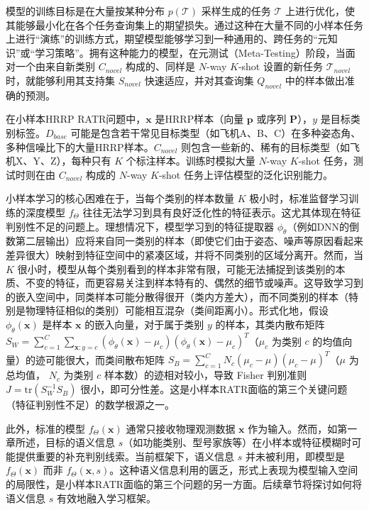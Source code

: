 模型的训练目标是在大量按某种分布 $p(\mathcal{T})$ 采样生成的任务 $\mathcal{T}$ 上进行优化，使其能够最小化在各个任务查询集上的期望损失。通过这种在大量不同的小样本任务上进行“演练”的训练方式，期望模型能够学习到一种通用的、跨任务的“元知识”或“学习策略”。拥有这种能力的模型，在元测试（Meta-Testing）阶段，当面对一个由来自新类别 $C_{novel}$ 构成的、同样是 $N$-way $K$-shot 设置的新任务 $\mathcal{T}_{novel}$ 时，就能够利用其支持集 $S_{novel}$ 快速适应，并对其查询集 $Q_{novel}$ 中的样本做出准确的预测。

在小样本HRRP RATR问题中，$\mathbf{x}$ 是HRRP样本（向量 $\mathbf{p}$ 或序列 $\mathbf{P}$），$y$ 是目标类别标签。$D_{base}$ 可能是包含若干常见目标类型（如飞机A、B、C）在多种姿态角、多种信噪比下的大量HRRP样本。$C_{novel}$ 则包含一些新的、稀有的目标类型（如飞机X、Y、Z），每种只有 $K$ 个标注样本。训练时模拟大量 $N$-way $K$-shot 任务，测试时则在由 $C_{novel}$ 构成的 $N$-way $K$-shot 任务上评估模型的泛化识别能力。

小样本学习的核心困难在于，当每个类别的样本数量 $K$ 极小时，标准监督学习训练的深度模型 $f_\Theta$ 往往无法学习到具有良好泛化性的特征表示。这尤其体现在特征判别性不足的问题上。理想情况下，模型学习到的特征提取器 $\phi_\theta$（例如DNN的倒数第二层输出）应将来自同一类别的样本（即使它们由于姿态、噪声等原因看起来差异很大）映射到特征空间中的紧凑区域，并将不同类别的区域分离开。然而，当 $K$ 很小时，模型从每个类别看到的样本非常有限，可能无法捕捉到该类别的本质、不变的特征，而更容易关注到样本特有的、偶然的细节或噪声。这导致学习到的嵌入空间中，同类样本可能分散得很开（类内方差大），而不同类别的样本（特别是物理特征相似的类别）可能相互混杂（类间距离小）。形式化地，假设 $\phi_\theta(\mathbf{x})$ 是样本 $\mathbf{x}$ 的嵌入向量，对于属于类别 $y$ 的样本，其类内散布矩阵 $S_W = \sum_{c=1}^C \sum_{\mathbf{x}: y=c} (\phi_\theta(\mathbf{x}) - \mu_c)(\phi_\theta(\mathbf{x}) - \mu_c)^T$（$\mu_c$ 为类别 $c$ 的均值向量）的迹可能很大，而类间散布矩阵 $S_B = \sum_{c=1}^C N_c (\mu_c - \mu)(\mu_c - \mu)^T$（$\mu$ 为总均值， $N_c$ 为类别 $c$ 样本数）的迹相对较小，导致 Fisher 判别准则 $J = \text{tr}(S_W^{-1} S_B)$ 很小，即可分性差。这是小样本RATR面临的第三个关键问题（特征判别性不足）的数学根源之一。

此外，标准的模型 $f_\Theta(\mathbf{x})$ 通常只接收物理观测数据 $\mathbf{x}$ 作为输入。然而，如第一章所述，目标的语义信息 $s$（如功能类别、型号家族等）在小样本或特征模糊时可能提供重要的补充判别线索。当前框架下，语义信息 $s$ 并未被利用，即模型是 $f_\Theta(\mathbf{x})$ 而非 $f_\Theta(\mathbf{x}, s)$。这种语义信息利用的匮乏，形式上表现为模型输入空间的局限性，是小样本RATR面临的第三个问题的另一方面。后续章节将探讨如何将语义信息 $s$ 有效地融入学习框架。

